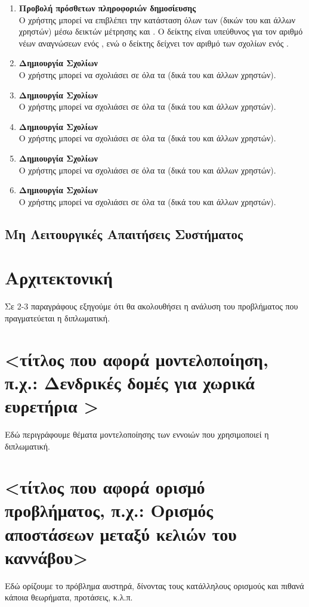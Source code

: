 \begin{enumerate}
    \item \textbf{Προβολή πρόσθετων πληροφοριών δημοσίευσης} \\
    Ο χρήστης μπορεί να επιβλέπει την κατάσταση όλων των  (δικών του και άλλων χρηστών) μέσω δεικτών μέτρησης  και . Ο δείκτης  είναι υπεύθυνος για τον αριθμό νέων αναγνώσεων ενός , ενώ ο δείκτης  δείχνει τον αριθμό των σχολίων ενός . 
    \item \textbf{Δημιουργία Σχολίων} \\
    Ο χρήστης μπορεί να σχολιάσει σε όλα τα  (δικά του και άλλων χρηστών).
    \item \textbf{Δημιουργία Σχολίων} \\
    Ο χρήστης μπορεί να σχολιάσει σε όλα τα  (δικά του και άλλων χρηστών).
    \item \textbf{Δημιουργία Σχολίων} \\
    Ο χρήστης μπορεί να σχολιάσει σε όλα τα  (δικά του και άλλων χρηστών).
    \item \textbf{Δημιουργία Σχολίων} \\
    Ο χρήστης μπορεί να σχολιάσει σε όλα τα  (δικά του και άλλων χρηστών).
    \item \textbf{Δημιουργία Σχολίων} \\
    Ο χρήστης μπορεί να σχολιάσει σε όλα τα  (δικά του και άλλων χρηστών).
\end{enumerate}



\subsection{Μη Λειτουργικές Απαιτήσεις Συστήματος}

\section{Αρχιτεκτονική}

Σε 2-3 παραγράφους εξηγούμε ότι θα ακολουθήσει η ανάλυση του προβλήματος που πραγματεύεται η διπλωματική.

\section{<τίτλος που αφορά μοντελοποίηση, π.χ.: Δενδρικές δομές για χωρικά ευρετήρια >}

Εδώ περιγράφουμε θέματα μοντελοποίησης των εννοιών που χρησιμοποιεί η διπλωματική.

\section{<τίτλος που αφορά ορισμό προβλήματος, π.χ.: Ορισμός αποστάσεων μεταξύ κελιών του καννάβου>}

Εδώ ορίζουμε το πρόβλημα αυστηρά, δίνοντας τους κατάλληλους ορισμούς και πιθανά κάποια θεωρήματα, προτάσεις, κ.λ.π. 



